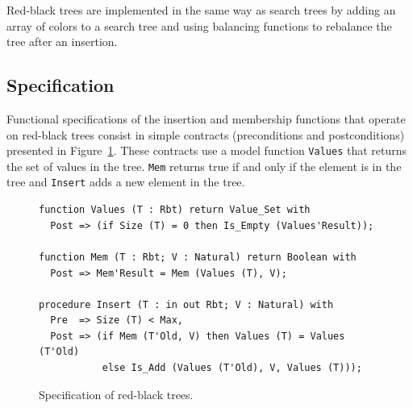 \documentclass{llncs}
\begin{document}
Red-black trees are implemented in the same way as search trees by adding an
array of colors to a search tree and using balancing functions to rebalance the
tree after an insertion.

\subsection{Specification}

Functional specifications of the insertion and membership functions that operate on
red-black trees consist in simple contracts (preconditions and postconditions)
presented in Figure~\ref{fig-rbt-spec}. These contracts use a model function
\texttt{Values} that returns the set of values in the tree. \texttt{Mem} returns
true if and only if the element is in the tree and \texttt{Insert} adds a new element
in the tree.


\begin{figure}[ht]
\begin{small}
\begin{lstlisting}
function Values (T : Rbt) return Value_Set with
  Post => (if Size (T) = 0 then Is_Empty (Values'Result));

function Mem (T : Rbt; V : Natural) return Boolean with
  Post => Mem'Result = Mem (Values (T), V);

procedure Insert (T : in out Rbt; V : Natural) with
  Pre  => Size (T) < Max,
  Post => (if Mem (T'Old, V) then Values (T) = Values (T'Old)
           else Is_Add (Values (T'Old), V, Values (T)));
\end{lstlisting}
\end{small}
\caption{\label{fig-rbt-spec} Specification of red-black trees.}
\end{figure}
\end{document}
